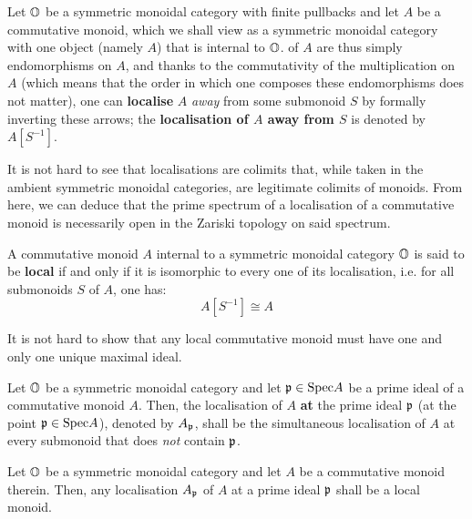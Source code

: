             \begin{definition} \label{def: commutative_monoid_localisation}
                Let $\mathbb{O}$ be a symmetric monoidal category with finite pullbacks and let $A$ be a commutative monoid, which we shall view as a symmetric monoidal category with one object (namely $A$) that is internal to $\mathbb{O}$.  of $A$ are thus simply endomorphisms on $A$, and thanks to the commutativity of the multiplication on $A$ (which means that the order in which one composes these endomorphisms does not matter), one can \textbf{localise} $A$ \textit{away} from some submonoid $S$ by formally inverting these arrows; the \textbf{localisation of $A$ away from $S$} is denoted by $A[S^{-1}]$. 
            \end{definition}
            \begin{remark} \label{remark: localisations_of_monoids_are_open}
                It is not hard to see that localisations are colimits that, while taken in the ambient symmetric monoidal categories, are legitimate colimits of monoids. From here, we can deduce that the prime spectrum of a localisation of a commutative monoid is necessarily open in the Zariski topology on said spectrum.
            \end{remark}
            
            \begin{definition} \label{def: local_monoids}
                A commutative monoid $A$ internal to a symmetric monoidal category $\mathbb{O}$ is said to be \textbf{local} if and only if it is isomorphic to every one of its localisation, i.e. for all submonoids $S$ of $A$, one has:
                    $$A[S^{-1}] \cong A$$
            \end{definition}
            \begin{remark}
                It is not hard to show that any local commutative monoid must have one and only one unique maximal ideal.
            \end{remark}
            \begin{convention} \label{conv: localising_commutative_monoids_at_primes}
                Let $\mathbb{O}$ be a symmetric monoidal category and let $\mathfrak{p} \in \mathrm{Spec} A$ be a prime ideal of a commutative monoid $A$. Then, the localisation of $A$ \textbf{at} the prime ideal $\mathfrak{p}$ (at the point $\mathfrak{p} \in \mathrm{Spec} A$), denoted by $A_{\mathfrak{p}}$, shall be the simultaneous localisation of $A$ at every submonoid that does \textit{not} contain $\mathfrak{p}$. 
            \end{convention}
            \begin{lemma} \label{lemma: localisations_at_primes_are_local}
                Let $\mathbb{O}$ be a symmetric monoidal category and let $A$ be a commutative monoid therein. Then, any localisation $A_{\mathfrak{p}}$ of $A$ at a prime ideal $\mathfrak{p}$ shall be a local monoid.
            \end{lemma}
                
